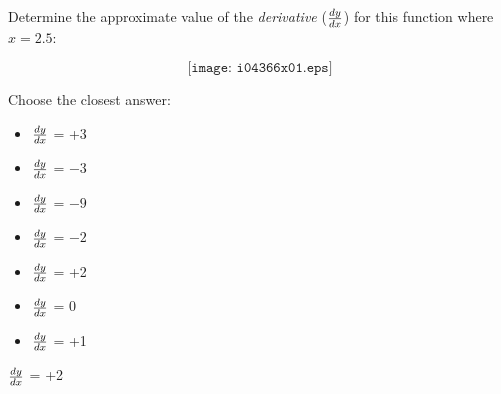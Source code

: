 

Determine the approximate value of the {\it derivative} ($dy \over dx$) for this function where $x=2.5$:

$$\texttt{[image: i04366x01.eps]}$$

Choose the closest answer:

\begin{itemize}
\item{} $dy \over dx$ = +3
\vskip 10pt 
\item{} $dy \over dx$ = $-3$
\vskip 10pt 
\item{} $dy \over dx$ = $-9$
\vskip 10pt 
\item{} $dy \over dx$ = $-2$
\vskip 10pt 
\item{} $dy \over dx$ = +2
\vskip 10pt 
\item{} $dy \over dx$ = 0
\vskip 10pt 
\item{} $dy \over dx$ = +1
\end{itemize}







$dy \over dx$ = +2











